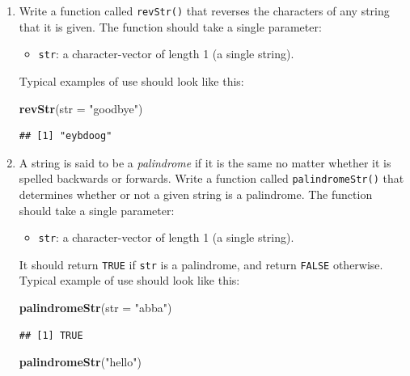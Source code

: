 \documentclass[]{book}
\makeatletter
\newenvironment{Shaded}{\begin{snugshade}}{\end{snugshade}}
\newcommand{\KeywordTok}[1]{\textcolor[rgb]{0.13,0.29,0.53}{\textbf{#1}}}
\newcommand{\DataTypeTok}[1]{\textcolor[rgb]{0.13,0.29,0.53}{#1}}
\newcommand{\StringTok}[1]{\textcolor[rgb]{0.31,0.60,0.02}{#1}}
\newcommand{\NormalTok}[1]{#1}
\providecommand{\tightlist}{%
  \setlength{\itemsep}{0pt}\setlength{\parskip}{0pt}}
\newenvironment{kframe}{%
\medskip{}
\setlength{\fboxsep}{.8em}
 \def\at@end@of@kframe{}%
 \ifinner\ifhmode%
  \def\at@end@of@kframe{\end{minipage}}%
  \begin{minipage}{\columnwidth}%
 \fi\fi%
 \def\FrameCommand##1{\hskip\@totalleftmargin \hskip-\fboxsep
 \colorbox{shadecolor}{##1}\hskip-\fboxsep
     \hskip-\linewidth \hskip-\@totalleftmargin \hskip\columnwidth}%
 \MakeFramed {\advance\hsize-\width
   \@totalleftmargin\z@ \linewidth\hsize
   \@setminipage}}%
 {\par\unskip\endMakeFramed%
 \at@end@of@kframe}
\renewenvironment{Shaded}{\begin{kframe}}{\end{kframe}}
\theoremstyle{definition}
\theoremstyle{definition}
\theoremstyle{definition}
\theoremstyle{remark}
\makeatother
\begin{document}
{\begin{enumerate}
\def\labelenumi{\arabic{enumi}.}
\tightlist
\item
  Write a function called \texttt{revStr()} that reverses the characters
  of any string that it is given. The function should take a single
  parameter:

  \begin{itemize}
  \tightlist
  \item
    \texttt{str}: a character-vector of length 1 (a single string).
  \end{itemize}

  Typical examples of use should look like this:

\begin{Shaded}
\begin{Highlighting}[]
\KeywordTok{revStr}\NormalTok{(}\DataTypeTok{str =} \StringTok{"goodbye"}\NormalTok{)}
\end{Highlighting}
\end{Shaded}

\begin{verbatim}
## [1] "eybdoog"
\end{verbatim}
\item
  A string is said to be a \emph{palindrome} if it is the same no matter
  whether it is spelled backwards or forwards. Write a function called
  \texttt{palindromeStr()} that determines whether or not a given string
  is a palindrome. The function should take a single parameter:

  \begin{itemize}
  \tightlist
  \item
    \texttt{str}: a character-vector of length 1 (a single string).
  \end{itemize}

  It should return \texttt{TRUE} if \texttt{str} is a palindrome, and
  return \texttt{FALSE} otherwise. Typical example of use should look
  like this:

\begin{Shaded}
\begin{Highlighting}[]
\KeywordTok{palindromeStr}\NormalTok{(}\DataTypeTok{str =} \StringTok{"abba"}\NormalTok{)}
\end{Highlighting}
\end{Shaded}

\begin{verbatim}
## [1] TRUE
\end{verbatim}

\begin{Shaded}
\begin{Highlighting}[]
\KeywordTok{palindromeStr}\NormalTok{(}\StringTok{"hello"}\NormalTok{)}
\end{Highlighting}
\end{Shaded}


\end{enumerate}}
\end{document}
